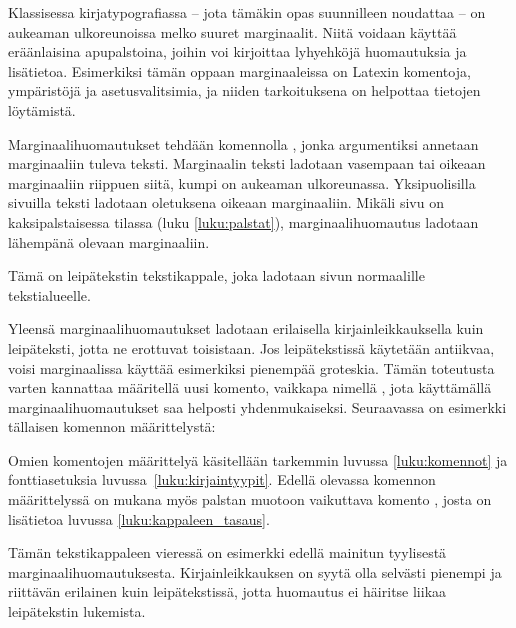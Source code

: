 Klassisessa kirjatypografiassa -- jota tämäkin opas suunnilleen
noudattaa -- on aukeaman ulkoreunoissa melko suuret marginaalit. Niitä
voidaan käyttää eräänlaisina apupalstoina, joihin voi kirjoittaa
lyhyehköjä huomautuksia ja lisätietoa. Esimerkiksi tämän oppaan
marginaaleissa on Latexin komentoja, ympäristöjä ja asetusvalitsimia, ja
niiden tarkoituksena on helpottaa tietojen löytämistä.

Marginaalihuomautukset tehdään komennolla , jonka
argumentiksi annetaan marginaaliin tuleva teksti. Marginaalin teksti
ladotaan vasempaan tai oikeaan marginaaliin riippuen siitä, kumpi on
aukeaman ulkoreunassa. Yksipuolisilla sivuilla teksti ladotaan
oletuksena oikeaan marginaaliin. Mikäli sivu on kaksipalstaisessa
tilassa (luku \ref{luku:palstat}), marginaalihuomautus ladotaan
lähempänä olevaan marginaaliin.

\begin{koodilohkosis}
  Tämä on leipätekstin tekstikappale,
  joka ladotaan sivun normaalille tekstialueelle.
\end{koodilohkosis}


Yleensä marginaalihuomautukset ladotaan erilaisella kirjainleikkauksella
kuin leipäteksti, jotta ne erottuvat toisistaan. Jos leipätekstissä
käytetään antiikvaa, voisi marginaalissa käyttää esimerkiksi pienempää
groteskia. Tämän toteutusta varten kannattaa määritellä uusi komento,
vaikkapa nimellä , jota käyttämällä
marginaalihuomautukset saa helposti yhdenmukaiseksi. Seuraavassa on
esimerkki tällaisen komennon määrittelystä:

\begin{koodilohkosis}
  \newcommand{\huomautus}[1]{%
    \marginpar{\sffamily\scriptsize\RaggedRight #1}}
\end{koodilohkosis}

Omien komentojen määrittelyä käsitellään tarkemmin luvussa
\ref{luku:komennot} ja fonttiasetuksia luvussa~\ref{luku:kirjaintyypit}.
Edellä olevassa komennon määrittelyssä on mukana myös palstan muotoon
vaikuttava komento , josta on lisätietoa luvussa
\ref{luku:kappaleen_tasaus}.

Tämän  tekstikappaleen vieressä
on esimerkki edellä mainitun tyylisestä marginaalihuomautuksesta.
Kirjainleikkauksen on syytä olla selvästi pienempi ja riittävän
erilainen kuin leipätekstissä, jotta huomautus ei häiritse liikaa
leipätekstin lukemista. \noclub[3]

